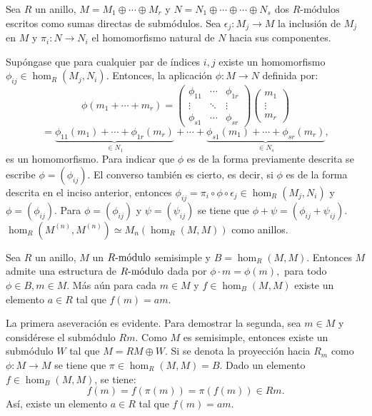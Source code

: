 \begin{lema}\label{lema:estructuraSemi}
Sea $R$ un anillo, $M = M_1 \oplus \cdots \oplus M_r$ y $N = N_1 \oplus \cdots \oplus \cdots \oplus N_s$ dos $R\mbox{-módulos}$ escritos como sumas directas de submódulos. Sea $\epsilon_j \colon M_j \to M$ la inclusión de $M_j$ en $M$ y $\pi_i \colon N \to N_i$ el homomorfismo natural de $N$ hacia sus componentes.
\begin{bulletList}
\newItem Supóngase que para cualquier par de índices $i,j$ existe un homomorfismo $\phi_{ij} \in \hom_R(M_j, N_i)$. Entonces,  la aplicación $\phi \colon M \to N$ definida por: \[\phi(m_1 + \cdots + m_r) = \begin{pmatrix}
\phi_{11} & \cdots & \phi_{1r} \\
\vdots & \ddots & \vdots \\
\phi_{s1} & \cdots & \phi_{sr}
\end{pmatrix} 
\begin{pmatrix}
m_1 \\
\vdots \\
m_r
\end{pmatrix}\]
\[ = \underset{\in N_1}{\underbrace{\phi_{11}(m_1) + \cdots + \phi_{1r}(m_r)}} +\cdots+\underset{\in N_s}{\underbrace{\phi_{s1}(m_1) + \cdots + \phi_{sr}(m_r)}}, \] es un homomorfismo. Para indicar que $\phi$ es de la forma previamente descrita se  escribe $\phi = (\phi_{ij})$. El converso también es cierto, es decir, si $\phi$ es de la forma descrita en el inciso anterior, entonces $\phi_{ij} = \pi_i\circ\phi\circ\epsilon_j \in \hom_R(M_j, N_i)$ y $\phi = (\phi_{ij})$.
\newItem Para $\phi = (\phi_{ij})$ y $\psi = (\psi_{ij})$ se tiene que $\phi + \psi = (\phi_{ij} +  \psi_{ij})$.
\newItem $\hom_R(M^{(n)}, M^{(n)}) \simeq M_n(\hom_R(M,M))$ como anillos. 
\end{bulletList} 
\end{lema}
\begin{lema}
Sea $R$ un anillo, $M$ un $\modulo{R}$ semisimple y $B= \hom_R(M,M)$. Entonces $M$  admite una estructura de $\modulo{B}$ dada por $\phi \cdot m = \phi(m),$ para todo $\phi \in B, m \in M$. Más aún para cada $m \in M$ y $f \in \hom_B(M,M)$ existe un elemento $a \in R$ tal que $f(m) = am$.  
\end{lema}
\begin{proof*}
La primera aseveración es evidente. Para demostrar la segunda, sea $m \in M$ y considérese el submódulo $Rm$. Como $M$ es semisimple, entonces existe un submódulo $W$ tal que $M = RM \oplus W$. Si se denota  la proyección hacia $R_m$ como $\phi \colon M \to M$ se tiene que $\pi \in \hom_R(M,M) = B$. Dado un elemento $f \in \hom_B(M,M)$, se tiene:\[ f(m) = f(\pi(m)) = \pi(f(m)) \in Rm. \] Así, existe un elemento $a \in R$ tal que $f(m) = am$. 
\end{proof*}
